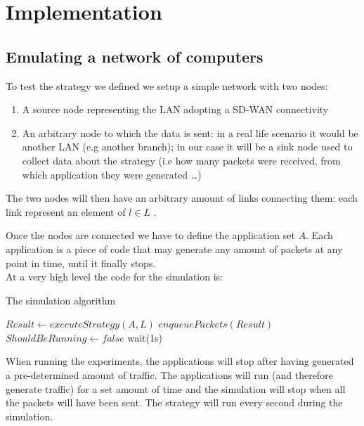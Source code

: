 
\section{Implementation}

\subsection{Emulating a network of computers}


To test the strategy we defined we setup a simple network with two nodes:
\begin{enumerate}
	\item A source node representing the LAN adopting a SD-WAN connectivity
	\item An arbitrary node to which the data is sent: in a real life scenario it would be another LAN (e.g another branch); in our case it will be a sink node used to collect data about the strategy (i.e how many packets were received, from which application they were generated \dots)  
\end{enumerate}

The two nodes will then have an arbitrary amount of links connecting them: each link represent an element of $l \in L$ .

Once the nodes are connected we have to define the application set $A$.
Each application is a piece of code that may generate any amount of packets at any point in time, until it finally stops.\\

At a very high level the code for the simulation is:

\begin{algorithm}
	\caption{The simulation algorithm}\label{alg:simulation}
	\begin{algorithmic}
		\State $Result \gets executeStrategy(A, L)$
		\State $enqueuePackets(Result)$
		\State $ShouldBeRunning \gets false$
		\EndIf
		\State wait(1s)
		\EndWhile
	\end{algorithmic}
\end{algorithm}

When running the experiments, the applications will stop after having generated a pre-determined amount of traffic. The applications will run (and therefore generate traffic) for a set amount of time and the simulation will stop when all the packets will have been sent.
The strategy will run every second during the simulation.

